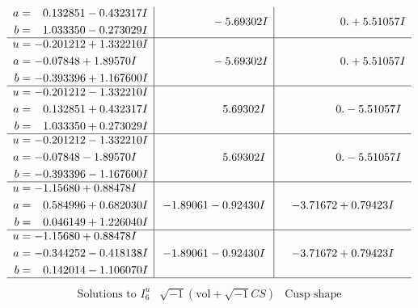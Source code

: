 \documentclass[1p]{elsarticle_modified}
\theoremstyle{definition}
\newcommand{\I}{\sqrt{-1}}
\begin{document}
$$\begin{array}{c|c|c}
\begin{aligned}
a &= \phantom{-}0.132851 - 0.432317 I \\
b &= \phantom{-}1.033350 - 0.273029 I\end{aligned}
 & \phantom{-0.000000 } -5.69302 I & \phantom{-0.000000 -}0. + 5.51057 I \\ \hline\begin{aligned}
u &= -0.201212 + 1.332210 I \\
a &= -0.07848 + 1.89570 I \\
b &= -0.393396 + 1.167600 I\end{aligned}
 & \phantom{-0.000000 } -5.69302 I & \phantom{-0.000000 -}0. + 5.51057 I \\ \hline\begin{aligned}
u &= -0.201212 - 1.332210 I \\
a &= \phantom{-}0.132851 + 0.432317 I \\
b &= \phantom{-}1.033350 + 0.273029 I\end{aligned}
 & \phantom{-0.000000 -}5.69302 I & \phantom{-0.000000 } 0. - 5.51057 I \\ \hline\begin{aligned}
u &= -0.201212 - 1.332210 I \\
a &= -0.07848 - 1.89570 I \\
b &= -0.393396 - 1.167600 I\end{aligned}
 & \phantom{-0.000000 -}5.69302 I & \phantom{-0.000000 } 0. - 5.51057 I \\ \hline\begin{aligned}
u &= -1.15680 + 0.88478 I \\
a &= \phantom{-}0.584996 + 0.682030 I \\
b &= \phantom{-}0.046149 + 1.226040 I\end{aligned}
 & -1.89061 - 0.92430 I & -3.71672 + 0.79423 I \\ \hline\begin{aligned}
u &= -1.15680 + 0.88478 I \\
a &= -0.344252 - 0.418138 I \\
b &= \phantom{-}0.142014 - 1.106070 I\end{aligned}
 & -1.89061 - 0.92430 I & -3.71672 + 0.79423 I\\
 \hline 
 \end{array}$$\newpage$$\begin{array}{c|c|c}  
\text{Solutions to }I^u_{6}& \I (\text{vol} + \sqrt{-1}CS) & \text{Cusp shape}\\
 \hline 
\begin{aligned}

\end{aligned}
\end{array}$$
\end{document}
